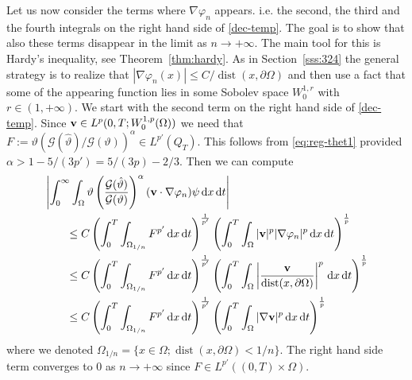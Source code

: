 \documentclass[11pt, a4paper, reqno]{amsart}
\numberwithin{equation}{section}
\newcommand{\thetah}{\hat\thet}
\newcommand{\vc}[1]{{\bf #1}}
\newcommand{\vv}{\vc{v}}
\newcommand{\thet}{\vartheta}
\newcommand{\dt}{\,{\rm d} t }
\newcommand{\dx}{\,{\rm d} {x}}
\newcommand{\G}{\mathcal{G}}
\newcommand{\al}{\alpha}
\newcommand{\QT}{Q_T}
\newcommand{\intnO}[1]{\int_0^{\infty}\intO{ #1 }\dt}
\newcommand{\intO}[1]{\int_{\Omega} #1 \dx}
\newcommand{\dist}{\operatorname{dist}}
\begin{document}
Let us now consider the terms where $\nabla\varphi_n$ appears. i.e. the second, the third and the fourth integrals on the right hand side of \eqref{dec-temp}. The goal is to show that also these terms disappear in the limit as $n\to+\infty$. The main tool for this is Hardy's inequality, see Theorem~\ref{thm:hardy}. As in Section~\ref{sss:324} the general strategy is to realize that $|\nabla \varphi_n(x)|\leq C/\dist(x,\partial\Omega)$ and then use a fact that some of the appearing function lies in some Sobolev space $W^{1,r}_0$ with $r\in(1,+\infty)$. We start with the second term on the right hand side of \eqref{dec-temp}. 
Since $\vv \in L^p(0,T;W^{1,p}_0(\Omega))$ we need that $F:=\thet({\G(\thetah)}/{\G(\thet)})^{\al} \in L^{p'}(\QT)$. This follows from \eqref{eq:reg-thet1} provided $\al>1-5/(3p')=5/(3p)-2/3$. Then we can compute
\begin{equation}
\begin{aligned}
&\left|\intnO{\thet\left(\frac{\G(\thetah)}{\G(\thet)}\right)^{\al}(\vv  \cdot \nabla\varphi_n)\psi } \right|\\
&\qquad \leq
C\left(\int_0^T\int_{\Omega_{1/n}}{F^{p'}}\dx \dt\right)^{\frac1{p'}}\left(\int_0^T\int_{\Omega}|\vv|^p |\nabla\varphi_n|^p\dx\dt\right)^{\frac1p}\\
&\qquad \leq
C\left(\int_0^T\int_{\Omega_{1/n}}{F^{p'}}\dx \dt\right)^{\frac1{p'}}\left(\int_0^T\int_{\Omega}\left|\frac{\vv}{\dist(x,\partial\Omega)}\right|^p \dx\dt\right)^{\frac1p}\\
&\qquad \leq C\left(\int_0^T\int_{\Omega_{1/n}}{F^{p'}}\dx \dt\right)^{\frac1{p'}}\left(\int_0^T\int_{\Omega}|\nabla\vv|^p \dx\dt\right)^{\frac1p}
\end{aligned}
\end{equation}
where we denoted $\Omega_{1/n}=\{x\in\Omega;\dist(x,\partial\Omega)<1/n\}$. The right hand side term converges to $0$ as $n\to+\infty$ since $F\in L^{p'}((0,T)\times\Omega)$.
\end{document}
